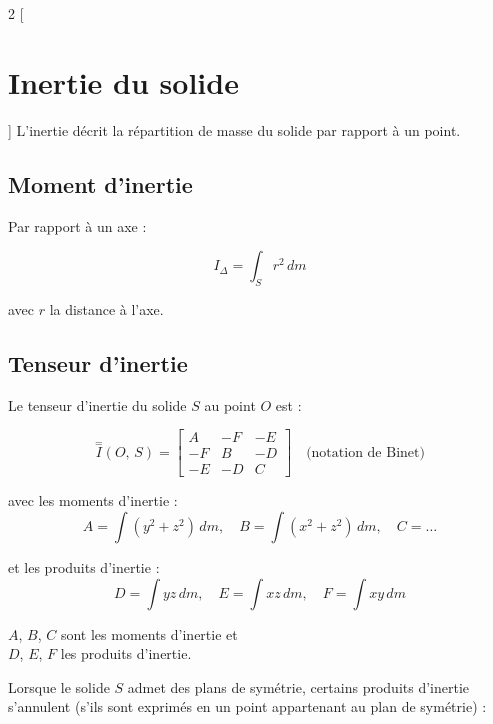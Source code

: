 \documentclass[10pt,a4paper]{article}
\newcommand{\Inertie}[2]{\overset{=}{I}(#1,\,#2)}
\begin{document}
        \begin{multicols}{2}
        [
        \section{Inertie du solide}
        ]
            L'inertie décrit la répartition de masse du solide
            par rapport à un point.

            \subsection{Moment d'inertie}

            Par rapport à un axe :

            \[
            I_\Delta = \int_S r^2\, dm
            \]

            avec $r$ la distance à l'axe.


        \subsection{Tenseur d'inertie}

            Le tenseur d'inertie du solide $S$ au point $O$ est :

            \[
            \Inertie{O}{S} =
            \begin{bmatrix}
            A  & -F & -E \\
            -F &  B & -D \\
            -E & -D &  C
            \end{bmatrix}
            \quad \text{(notation de Binet)}
            \]

            avec les moments d'inertie :
            \[
            A = \int (y^2+z^2)\,dm, \quad
            B = \int (x^2+z^2)\,dm, \quad
            C = \dots
            \]

            et les produits d'inertie :
            \[
            D = \int yz\,dm, \quad
            E = \int xz\,dm, \quad
            F = \int xy\,dm
            \]

        \noindent $A$, $B$, $C$ sont les moments d'inertie et \\
        $D$, $E$, $F$ les produits d'inertie.\newline

        Lorsque le solide $S$ admet des plans de symétrie, certains produits d'inertie s'annulent (s'ils sont exprimés en un point appartenant au plan de symétrie) :


\end{multicols}
\end{document}
